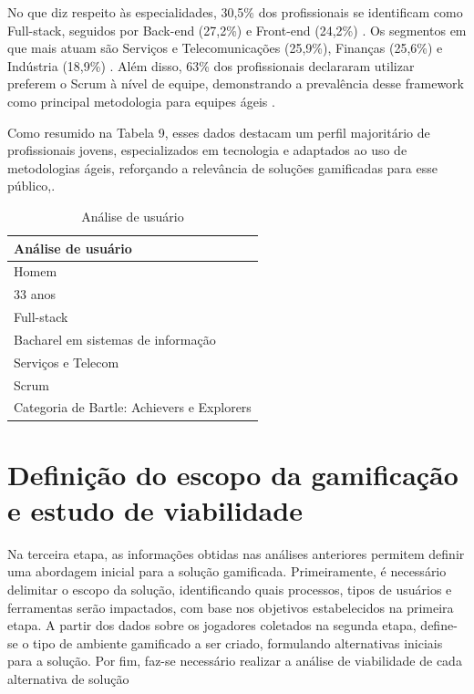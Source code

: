 \documentclass[
	12pt,
	openright,
	twoside,
	a4paper,
	english,
	brazil
	]{abntex2}
\begin{document}
No que diz respeito às especialidades, 30,5\% dos profissionais se identificam como Full-stack, seguidos por Back-end (27,2\%) e Front-end (24,2\%) \cite{revelo2021tecnologia}. Os segmentos em que mais atuam são Serviços e Telecomunicações (25,9\%), Finanças (25,6\%) e Indústria (18,9\%) \cite{abes2023mercado}. Além disso, 63\% dos profissionais declararam utilizar preferem o Scrum à nível de equipe, demonstrando a prevalência desse framework como principal metodologia para equipes ágeis \cite{17_agile_report}.

Como resumido na Tabela 9, esses dados destacam um perfil majoritário de profissionais jovens, especializados em tecnologia e adaptados ao uso de metodologias ágeis, reforçando a relevância de soluções gamificadas para esse público,.

\begin{table}[h!]
  \centering
  \caption{Análise de usuário}
  \begin{tabular}{|p{6.5cm}|}
  \hline
  \textbf{Análise de usuário} \\ \hline
  Homem \\ \hline
  33 anos \\ \hline
  Full-stack \\ \hline
  Bacharel em sistemas de informação \\ \hline
  Serviços e Telecom \\ \hline
  Scrum \\ \hline
  Categoria de Bartle: Achievers e Explorers \\ \hline
  \end{tabular}
\end{table}
  
\section{Definição do escopo da gamificação e estudo de viabilidade}

Na terceira etapa, as informações obtidas nas análises anteriores permitem definir uma abordagem inicial para a solução gamificada. Primeiramente, é necessário delimitar o escopo da solução, identificando quais processos, tipos de usuários e ferramentas serão impactados, com base nos objetivos estabelecidos na primeira etapa. A partir dos dados sobre os jogadores coletados na segunda etapa, define-se o tipo de ambiente gamificado a ser criado, formulando alternativas iniciais para a solução. Por fim, faz-se necessário realizar a análise de viabilidade de cada alternativa de solução
\end{document}
